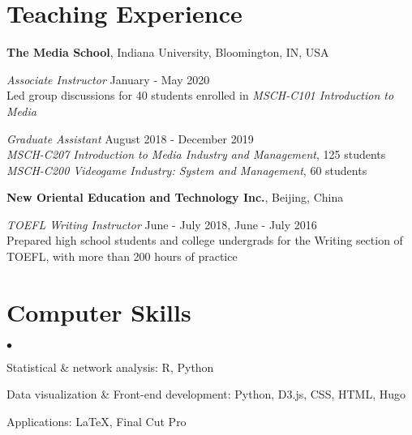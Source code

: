 \documentclass[margin,line, 10pt]{res}
\newenvironment{list2}{
  \begin{list}{$\bullet$}{%
      \setlength{\itemsep}{0in}
      \setlength{\parsep}{0in} \setlength{\parskip}{0in}
      \setlength{\topsep}{0in} \setlength{\partopsep}{0in} 
      \setlength{\leftmargin}{0.2in}}}{\end{list}}
\begin{document}
\begin{resume}




\section{\sc Teaching Experience}
{\bf The Media School}, Indiana University, Bloomington, IN, USA

\vspace{-.3cm}
{\em Associate Instructor} \hfill {January - May 2020}\\
Led group discussions for 40 students enrolled in \textit {MSCH-C101 Introduction to Media}

{\em Graduate Assistant} \hfill {August 2018 - December 2019}\\
\textit{MSCH-C207 Introduction to Media Industry and Management}, 125 students \\
\textit{MSCH-C200 Videogame Industry: System and Management}, 60 students

{\bf New Oriental Education and Technology Inc.}, Beijing, China

\vspace{-.3cm}
{\em TOEFL Writing Instructor} \hfill {June - July 2018, June - July 2016}\\
Prepared high school students and college undergrads for the Writing section of TOEFL, with more than 200 hours of practice

\section{\sc Computer Skills} 
\begin{list2}
\item Statistical \& network analysis:  R, Python
\item Data visualization \& Front-end development:  Python, D3.js, CSS, HTML, Hugo
\item Applications: \LaTeX, Final Cut Pro
\end{list2}

\end{resume}
\thispagestyle{lastpage}
\end{document}
